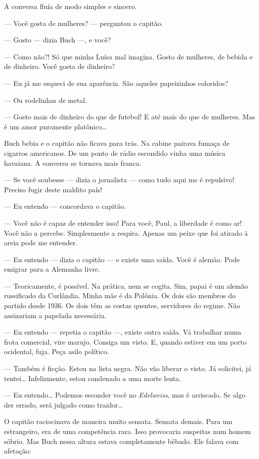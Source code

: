 A conversa fluía de modo simples e sincero.

--- Você gosta de mulheres? --- perguntou o capitão.

--- Gosto --- dizia Buch ---, e você?

--- Como não?! Só que minha Luísa mal imagina. Gosto de mulheres, de
bebida e de dinheiro. Você gosta de dinheiro?

--- Eu já me esqueci de sua aparência. São aqueles papeizinhos
coloridos?

--- Ou rodelinhas de metal.

--- Gosto mais de dinheiro do que de futebol! E até mais do que de
mulheres. Mas é um amor puramente platônico\ldots{}

Buch bebia e o capitão não ficava para trás. Na cabine pairava fumaça de
cigarros americanos. De um ponto de rádio escondido vinha uma música
havaiana. A conversa se tornava mais franca.

--- Se você soubesse --- dizia o jornalista --- como tudo aqui me é
repulsivo! Preciso fugir deste maldito país!

--- Eu entendo --- concordava o capitão.

--- Você não é capaz de entender isso! Para você, Paul, a liberdade é
como ar! Você não a percebe. Simplesmente a respira. Apenas um peixe que
foi atirado à areia pode me entender.

--- Eu entendo --- dizia o capitão --- e existe uma saída. Você é
alemão. Pode emigrar para a Alemanha livre.

--- Teoricamente, é possível. Na prática, nem se cogita. Sim, papai é um
alemão russificado da Curlândia. Minha mãe é da Polônia. Os dois são
membros do partido desde 1936. Os dois têm as costas quentes, servidores
do regime. Não assinariam a papelada necessária.

--- Eu entendo --- repetia o capitão ---, existe outra saída. Vá
trabalhar numa frota comercial, vire marujo. Consiga um visto. E, quando
estiver em um porto ocidental, fuja. Peça asilo político.

--- Também é ficção. Estou na lista negra. Não vão liberar o visto. Já
solicitei, já tentei\ldots{} Infelizmente, estou condenado a uma morte lenta.

--- Eu entendo\ldots{} Podemos esconder você no \emph{Edelweiss}, mas é
arriscado. Se algo der errado, será julgado como traidor\ldots{}

O capitão raciocinava de maneira muito sensata. Sensata demais. Para um
estrangeiro, era de uma competência rara. Isso provocaria suspeitas num
homem sóbrio. Mas Buch nessa altura estava completamente bêbado. Ele
falava com afetação:

